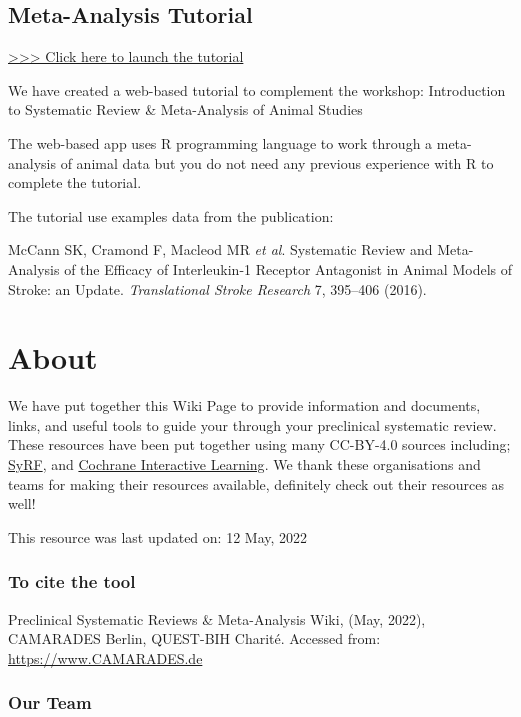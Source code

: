\documentclass[
]{book}
\begin{document}
\hypertarget{meta-analysis-tutorial}{%
\section{Meta-Analysis Tutorial}\label{meta-analysis-tutorial}}

\href{https://s-quest.bihealth.org/CAMARADES_MA/}{\textgreater\textgreater\textgreater{} Click here to launch the tutorial}

We have created a web-based tutorial to complement the workshop:
Introduction to Systematic Review \& Meta-Analysis of Animal Studies

The web-based app uses R programming language to work through a meta-analysis of animal data but you do not need any previous experience with R to complete the tutorial.

The tutorial use examples data from the publication:

McCann SK, Cramond F, Macleod MR \emph{et al}. Systematic Review and
Meta-Analysis of the Efficacy of Interleukin-1 Receptor Antagonist in
Animal Models of Stroke: an Update. \emph{Translational Stroke Research} 7, 395--406 (2016).

\hypertarget{about}{%
\chapter{About}\label{about}}

We have put together this Wiki Page to provide information and documents, links, and useful tools to guide your through your preclinical systematic review. These resources have been put together using many CC-BY-4.0 sources including; \href{https://syrf.org.uk/}{SyRF}, and \href{https://training.cochrane.org/interactivelearning}{Cochrane Interactive Learning}. We thank these organisations and teams for making their resources available, definitely check out their resources as well!

This resource was last updated on: 12 May, 2022

\hypertarget{to-cite-the-tool}{%
\subsection{To cite the tool}\label{to-cite-the-tool}}

Preclinical Systematic Reviews \& Meta-Analysis Wiki, (May, 2022), CAMARADES Berlin, QUEST-BIH Charité. Accessed from: \url{https://www.CAMARADES.de}

\hypertarget{our-team}{%
\subsection{Our Team}\label{our-team}}
\end{document}
